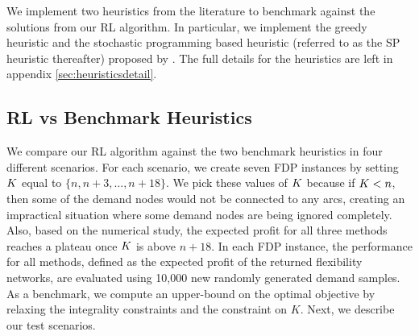 \documentclass{article} %
\begin{document}


We implement two heuristics from the literature to benchmark against the solutions from our RL algorithm. In particular, we implement the greedy heuristic and the stochastic programming based heuristic (referred to as the SP heuristic thereafter) proposed by \citet{feng2017process}. The full details for the heuristics are left in appendix \ref{sec:heuristicsdetail}. 







\subsection{RL vs Benchmark Heuristics}
We compare our RL algorithm against the two benchmark heuristics in four different scenarios. For each scenario, we create seven FDP instances by setting $K$ equal to $\{n, n+3, \ldots, n+18\}$. We pick these values of $K$ because if $K<n$, then some of the demand nodes would not be connected to any arcs, creating an impractical situation where some demand nodes are being ignored completely. Also, based on the numerical study, the expected profit for all three methods reaches a plateau once $K$ is above $n+18$. In each FDP instance, the performance for all methods, defined as the expected profit of the returned flexibility networks, are evaluated using 10,000 new randomly generated demand samples. As a benchmark, we compute an upper-bound on the optimal objective by relaxing the integrality constraints and the constraint on $K$. Next, we describe our test scenarios. 
\end{document}
